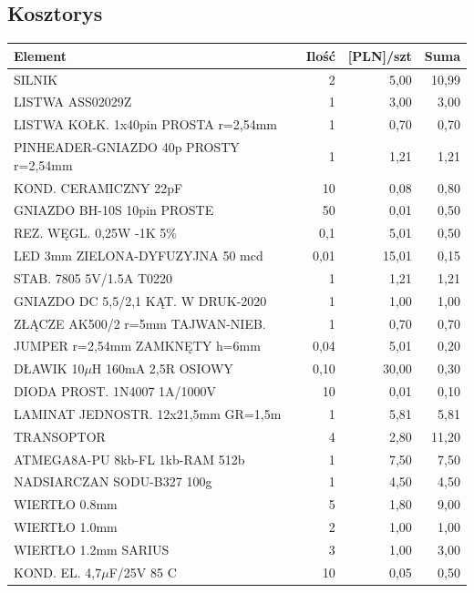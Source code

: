 \documentclass[11pt,a4paper]{article}
\begin{document}
  
  
\vspace{3cm}
\subsection{Kosztorys}
\begin{longtable}{|l|r|r|r|}
  \hline
  Element & Ilość & [PLN]/szt & Suma \\
  \hline \hline
  SILNIK & 2 & 5,00 & 10,99\\
  LISTWA ASS02029Z & 1 & 3,00 & 3,00 \\
  LISTWA KOŁK. 1x40pin PROSTA r=2,54mm & 1 & 0,70 & 0,70 \\
  PINHEADER-GNIAZDO 40p PROSTY r=2,54mm & 1 & 1,21 & 1,21 \\
  KOND. CERAMICZNY 22pF & 10 & 0,08 & 0,80 \\
  GNIAZDO BH-10S 10pin PROSTE & 50 & 0,01 & 0,50 \\
  REZ. WĘGL. 0,25W -1K 5\% & 0,1 & 5,01 & 0,50 \\
  LED 3mm ZIELONA-DYFUZYJNA 50 mcd & 0,01 & 15,01 & 0,15 \\
  STAB. 7805 5V/1.5A T0220 & 1 & 1,21 & 1,21 \\
  GNIAZDO DC 5,5/2,1 KĄT. W DRUK-2020 & 1 & 1,00 & 1,00 \\
  ZŁĄCZE AK500/2 r=5mm TAJWAN-NIEB. & 1 & 0,70 & 0,70 \\
  JUMPER r=2,54mm ZAMKNĘTY h=6mm & 0,04 & 5,01 & 0,20 \\
  DŁAWIK 10$\mu$H 160mA 2,5R OSIOWY & 0,10 & 30,00 & 0,30 \\
  DIODA PROST. 1N4007 1A/1000V & 10 & 0,01 & 0,10 \\
  LAMINAT JEDNOSTR. 12x21,5mm GR=1,5m & 1 & 5,81 & 5,81 \\
  TRANSOPTOR & 4 & 2,80 & 11,20 \\
  ATMEGA8A-PU 8kb-FL 1kb-RAM 512b & 1 & 7,50 & 7,50 \\
  NADSIARCZAN SODU-B327 100g & 1 & 4,50 & 4,50 \\
  WIERTŁO 0.8mm & 5 & 1,80 & 9,00 \\
  WIERTŁO 1.0mm & 2 & 1,00 & 1,00 \\
  WIERTŁO 1.2mm SARIUS & 3 & 1,00 & 3,00 \\
  KOND. EL. 4,7$\mu$F/25V 85 C & 10 & 0,05 & 0,50 \\ 

\end{longtable}
\end{document}
